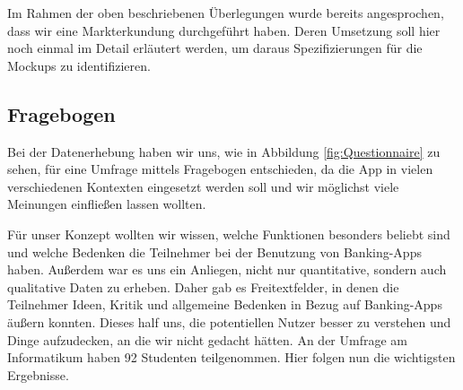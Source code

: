 Im Rahmen der oben beschriebenen Überlegungen wurde bereits angesprochen, dass wir eine Markterkundung durchgeführt haben. Deren Umsetzung soll hier noch einmal im Detail erläutert werden, um daraus Spezifizierungen für die Mockups zu identifizieren.

\subsection{Fragebogen}
	Bei der Datenerhebung haben wir uns, wie in Abbildung \ref{fig:Questionnaire} zu sehen, für eine Umfrage mittels Fragebogen entschieden, da die App in vielen verschiedenen Kontexten eingesetzt werden soll und wir möglichst viele Meinungen einfließen lassen wollten. 
	
	Für unser Konzept wollten wir wissen, welche Funktionen besonders beliebt sind und welche Bedenken die Teilnehmer bei der Benutzung von Banking-Apps haben. Außerdem war es uns ein Anliegen, nicht nur quantitative, sondern auch qualitative Daten zu erheben. Daher gab es Freitextfelder, in denen die Teilnehmer Ideen, Kritik und allgemeine Bedenken in Bezug auf Banking-Apps äußern konnten. Dieses half uns, die potentiellen Nutzer besser zu verstehen und Dinge aufzudecken, an die wir nicht gedacht hätten. An der Umfrage am Informatikum haben 92 Studenten teilgenommen. Hier folgen nun die wichtigsten Ergebnisse. 
	
